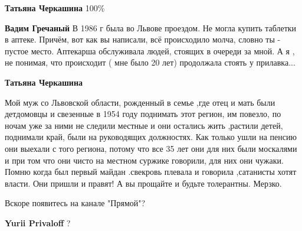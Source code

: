 \begin{itemize}
\begin{itemize}
\textbf{Татьяна Черкашина} 100\%

 
\textbf{Вадим Гречаный} В 1986 г была во Львове проездом. Не могла купить
таблетки в аптеке. Причём, вот как вы написали, всё происходило молча, словно
ты - пустое место. Аптекарша обслуживала людей, стоящих в очереди за мной. А я
, не понимая, что происходит ( мне было 20 лет) продолжала стоять у прилавка...

 
\textbf{Татьяна Черкашина} 

Мой муж со Львовской области, рожденный в семье ,где
отец и мать были детдомовцы и свезенные в 1954 году поднимать этот регион, им
повезло, по ночам уже за ними не следили местные и они остались жить ,растили
детей, поднимали край, были на руководящих должностях. Как только ушли на пенсию
они выехали с того региона, потому что все 35 лет они для них были москалями и
при том что они чисто на местном суржике говорили, для них они чужаки. Помню
когда был первый майдан .свекровь плевала и говорила ,сатанисты хотят
власти. Они пришли и правят! А вы прощайте и будьте толерантны. Мерзко.

\end{itemize}

 
Вскоре появитесь на канале "Прямой"?

\begin{itemize}
 
\textbf{Yurii Privaloff} ?


\end{itemize}
\end{itemize}
